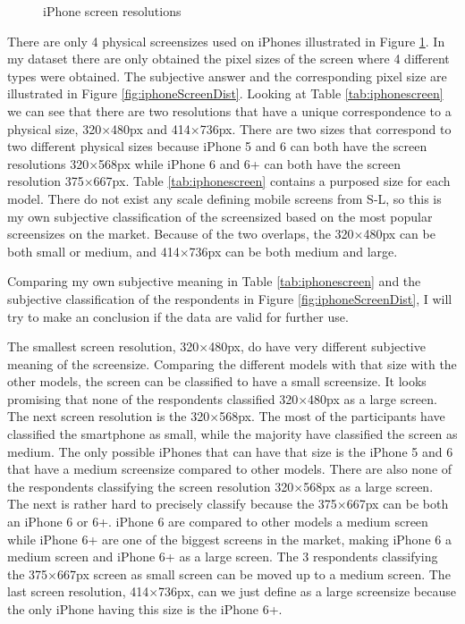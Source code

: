 \begin{figure}[H]
{        \label{fig:iphone55}
      }

      \caption{iPhone screen resolutions}
      \label{fig:iphonescreenresolutions}
    \end{figure}

    There are only 4 physical screensizes used on iPhones illustrated in Figure \ref{fig:iphonescreenresolutions}. In my dataset there are only obtained the pixel sizes of the screen where 4 different types were obtained. The subjective answer and the corresponding pixel size are illustrated in Figure \ref{fig:iphoneScreenDist}. Looking at Table \ref{tab:iphonescreen} we can see that there are two resolutions that have a unique correspondence to a physical size, 320$\times$480px  and 414$\times$736px. There are two sizes that correspond to two different physical sizes because iPhone 5 and 6 can both have the screen resolutions 320$\times$568px while iPhone 6 and 6+ can both have the screen resolution 375$\times$667px. Table \ref{tab:iphonescreen} contains a purposed size for each model. There do not exist any scale defining mobile screens from S-L, so this is my own subjective classification of the screensized based on the most popular screensizes on the market. Because of the two overlaps, the 320$\times$480px can be both small or medium, and 414$\times$736px can be both medium and large.

    Comparing my own subjective meaning in Table \ref{tab:iphonescreen} and the subjective classification of the respondents in Figure \ref{fig:iphoneScreenDist}, I will try to make an conclusion if the data are valid for further use. 

    The smallest screen resolution, 320$\times$480px, do have very different subjective meaning of the screensize. Comparing the different models with that size with the other models, the screen can be classified to have a small screensize. It looks promising that none of the respondents classified 320$\times$480px as a large screen. The next screen resolution is the 320$\times$568px. The most of the participants have classified the smartphone as small, while the majority have classified the screen as medium. The only possible iPhones that can have that size is the iPhone 5 and 6 that have a medium screensize compared to other models. There are also none of the respondents classifying the screen resolution 320$\times$568px as a large screen. The next is rather hard to precisely classify because the 375$\times$667px can be both an iPhone 6 or 6+. iPhone 6 are compared to other models a medium screen while iPhone 6+ are one of the biggest screens in the market, making iPhone 6 a medium screen and iPhone 6+ as a large screen. The 3 respondents classifying the 375$\times$667px screen as small screen can be moved up to a medium screen. The last screen resolution, 414$\times$736px, can we just define as a large screensize because the only iPhone having this size is the iPhone 6+. 

